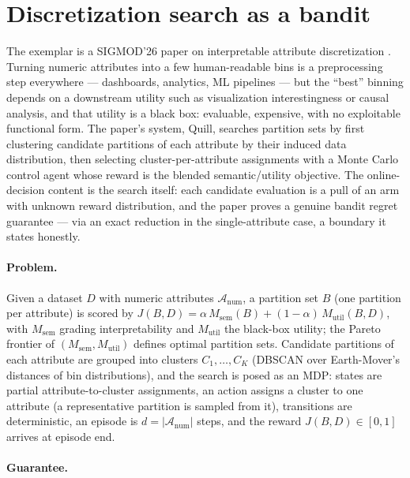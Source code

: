 \section{Discretization search as a bandit}
\label{sec:onl-quill}

The exemplar is a SIGMOD'26 paper on interpretable attribute discretization
\citep{sigmod26-140}. Turning numeric attributes into a few human-readable
bins is a preprocessing step everywhere --- dashboards, analytics, ML pipelines
--- but the ``best'' binning depends on a downstream utility such as
visualization interestingness or causal analysis, and that utility is a black
box: evaluable, expensive, with no exploitable functional form. The paper's
system, Quill, searches partition sets by first clustering candidate partitions
of each attribute by their induced data distribution, then selecting
cluster-per-attribute assignments with a Monte Carlo control agent whose
reward is the blended semantic/utility objective. The online-decision content
is the search itself: each candidate evaluation is a pull of an arm with
unknown reward distribution, and the paper proves a genuine bandit regret
guarantee --- via an exact reduction in the single-attribute case, a boundary
it states honestly.

\paragraph{Problem.}
Given a dataset $D$ with numeric attributes $\mathcal{A}_{\mathrm{num}}$, a
partition set $B$ (one partition per attribute) is scored by
$J(B,D) = \alpha\,M_{\mathrm{sem}}(B) + (1-\alpha)\,M_{\mathrm{util}}(B,D)$,
with $M_{\mathrm{sem}}$ grading interpretability and $M_{\mathrm{util}}$ the
black-box utility; the Pareto frontier of
$(M_{\mathrm{sem}}, M_{\mathrm{util}})$ defines optimal partition sets.
Candidate partitions of each attribute are grouped into clusters
$C_1,\dots,C_K$ (DBSCAN over Earth-Mover's distances of bin distributions),
and the search is posed as an MDP: states are partial attribute-to-cluster
assignments, an action assigns a cluster to one attribute (a representative
partition is sampled from it), transitions are deterministic, an episode is
$d = |\mathcal{A}_{\mathrm{num}}|$ steps, and the reward $J(B,D) \in [0,1]$
arrives at episode end.

\paragraph{Guarantee.}

